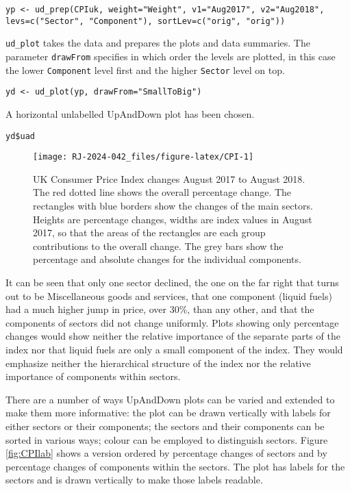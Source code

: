 \texttt{yp\ \textless{}-\ ud\_prep(CPIuk,\ weight="Weight",\ v1="Aug2017",\ v2="Aug2018",} \texttt{levs=c("Sector",\ "Component"),\ sortLev=c("orig",\ "orig"))}

\texttt{ud\_plot} takes the data and prepares the plots and data summaries. The parameter \texttt{drawFrom} specifies in which order the levels are plotted, in this case the lower \texttt{Component} level first and the higher \texttt{Sector} level on top.

\texttt{yd\ \textless{}-\ ud\_plot(yp,\ drawFrom="SmallToBig")}

A horizontal unlabelled UpAndDown plot has been chosen.

\texttt{yd\$uad}

\begin{figure}

{\centering \texttt{[image: RJ-2024-042\_files/figure-latex/CPI-1]} 

}

\caption{UK Consumer Price Index changes August 2017 to August 2018.  The red dotted line shows the overall percentage change.  The rectangles with blue borders show the changes of the main sectors.  Heights are percentage changes, widths are index values in August 2017, so that the areas of the rectangles are each group contributions to the overall change.  The grey bars show the percentage and absolute changes for the individual components.}\label{fig:CPI}
\end{figure}

It can be seen that only one sector declined, the one on the far right that turns out to be Miscellaneous goods and services, that one component (liquid fuels) had a much higher jump in price, over 30\%, than any other, and that the components of sectors did not change uniformly. Plots showing only percentage changes would show neither the relative importance of the separate parts of the index nor that liquid fuels are only a small component of the index. They would emphasize neither the hierarchical structure of the index nor the relative importance of components within sectors.

There are a number of ways UpAndDown plots can be varied and extended to make them more informative: the plot can be drawn vertically with labels for either sectors or their components; the sectors and their components can be sorted in various ways; colour can be employed to distinguish sectors. Figure \ref{fig:CPIlab} shows a version ordered by percentage changes of sectors and by percentage changes of components within the sectors. The plot has labels for the sectors and is drawn vertically to make those labels readable.

